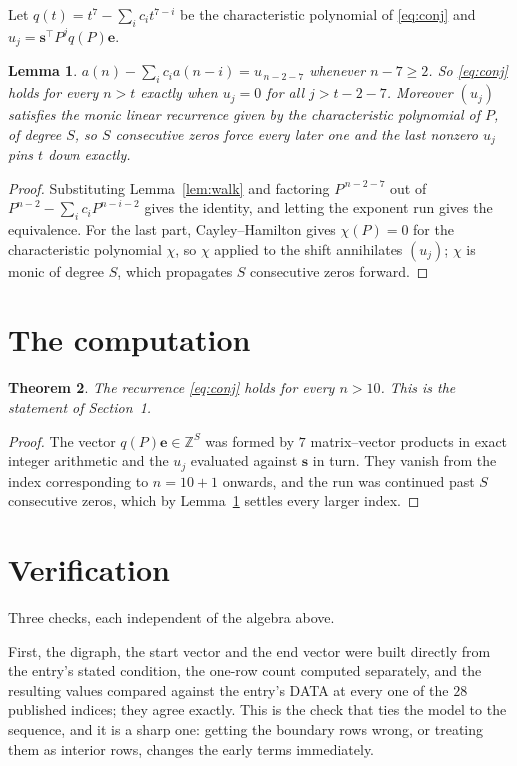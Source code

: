 \documentclass[11pt,a4paper]{article}
\theoremstyle{plain}
\newtheorem{theorem}{Theorem}
\newtheorem{lemma}[theorem]{Lemma}
\theoremstyle{definition}
\begin{document}
Let $q(t)=t^{7}-\sum_i c_i t^{7-i}$ be the characteristic polynomial of
\eqref{eq:conj} and $u_j=\mathbf{s}^{\!\top}P^{j}q(P)\mathbf{e}$.

\begin{lemma}\label{lem:crit}
$a(n)-\sum_i c_i a(n-i)=u_{\,n-2-7}$ whenever $n-7\ge2$. So \eqref{eq:conj}
holds for every $n>t$ exactly when $u_j=0$ for all $j>t-2-7$. Moreover $(u_j)$
satisfies the monic linear recurrence given by the characteristic polynomial of $P$, of
degree $S$, so $S$ consecutive zeros force every later one and the last nonzero $u_j$ pins
$t$ down exactly.
\end{lemma}

\begin{proof}
Substituting Lemma~\ref{lem:walk} and factoring $P^{\,n-2-7}$ out of
$P^{n-2}-\sum_i c_i P^{n-i-2}$ gives the identity, and letting the exponent run gives the
equivalence. For the last part, Cayley--Hamilton gives $\chi(P)=0$ for the characteristic
polynomial $\chi$, so $\chi$ applied to the shift annihilates $(u_j)$; $\chi$ is monic of
degree $S$, which propagates $S$ consecutive zeros forward.
\end{proof}

\section{The computation}

\begin{theorem}
The recurrence \eqref{eq:conj} holds for every $n>10$. This is the statement of
Section~1.
\end{theorem}

\begin{proof}
The vector $q(P)\mathbf{e}\in\mathbb{Z}^{S}$ was formed by $7$ matrix--vector
products in exact integer arithmetic and the $u_j$ evaluated against $\mathbf{s}$ in turn.
They vanish from the index corresponding to $n=10+1$ onwards, and the run was continued
past $S$ consecutive zeros, which by Lemma~\ref{lem:crit} settles every larger index.
\end{proof}

\section{Verification}

Three checks, each independent of the algebra above.

First, the digraph, the start vector and the end vector were built directly from the
entry's stated condition, the one-row count computed separately, and the resulting values
compared against the entry's DATA at every one of the $28$ published indices; they
agree exactly. This is the check that ties the model to the sequence, and it is a sharp one:
getting the boundary rows wrong, or treating them as interior rows, changes the early terms
immediately.
\end{document}
